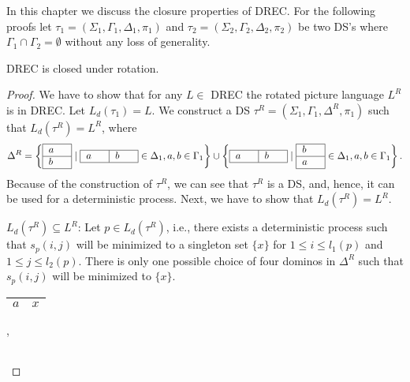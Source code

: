 In this chapter we discuss the closure properties of DREC.
For the following proofs let $\tau_1 = (\Sigma_1, \Gamma_1, \Delta_1, \pi_1)$ and $\tau_2 =
(\Sigma_2, \Gamma_2, \Delta_2, \pi_2)$ be two DS's where $\Gamma_1 \cap \Gamma_2
= \emptyset$ without any loss of generality. 
\begin{theorem}
DREC is closed under rotation.
\label{drec_closed_under_rotation}
\end{theorem}
\begin{proof} 
We have to show that for any $L \in $ DREC the rotated picture language $L^R$ is in DREC. Let
$L_d(\tau_1) = L$.
We construct a DS $\tau^R = (\Sigma_1, \Gamma_1, \Delta^R, \pi_1)$ such that $L_d(\tau^R) = L^R$, where
\begin{align*}
\Delta^R = \left\lbrace\begin{tabular}{|C{0.6cm}|} 
\hline 
$a$ \tabularnewline 
\hline 
$b$ \tabularnewline
\hline 
\end{tabular} \mid 
\begin{tabular}{|C{0.6cm}|C{0.6cm}|} 
\hline 
$a$ & $b$ \tabularnewline
\hline 
\end{tabular} \in \Delta_1, a, b\in\Gamma_1\right\rbrace \cup 
\left\lbrace\begin{tabular}{|C{0.6cm}|C{0.6cm}|} 
\hline 
$a$ & $b$ \tabularnewline
\hline 
\end{tabular} \mid 
\begin{tabular}{|C{0.6cm}|} 
\hline 
$b$ \tabularnewline 
\hline 
$a$ \tabularnewline
\hline 
\end{tabular} \in \Delta_1, a,b\in\Gamma_1\right\rbrace.
\end{align*}
Because of the construction of $\tau^R$, we can see that $\tau^R$ is a DS, and, hence, it can be
used for a deterministic process. Next, we have to show that $L_d(\tau^R) = L^R$.
\begin{compactitem}
\item $L_d(\tau^R) \subseteq L^R$:\newline
Let $p\in L_d(\tau^R)$, i.e., there exists a deterministic process such that $s_p(i, j)$ will be
minimized to a singleton set $\lbrace x\rbrace$ for $1 \leq i \leq l_1(p)$ and $1 \leq j \leq
l_2(p)$. There is only one possible choice of four dominos in $\Delta^R$ such that $s_p(i, j)$ will
be minimized to $\lbrace x \rbrace$.
\begin{tabular}{|C{0.6cm}|C{0.6cm}|} 
\hline 
$a$ & $x$ \tabularnewline
\hline 
\end{tabular}, 
\begin{tabular}{|C{0.6cm}|} 

\end{tabular}
\end{compactitem}
\end{proof}
